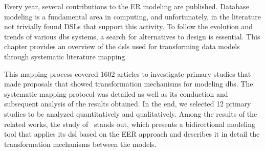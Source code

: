 Every year, several contributions to the ER modeling are published.
Database modeling is a fundamental area in computing, and unfortunately, in the literature not trivially found DSLs that support this activity.
To follow the evolution and trends of various \acp{db} systems, a search for alternatives to design is essential.
This chapter provides an overview of the \acp{dsl} used for transforming data models through systematic literature mapping.

This mapping process covered 1602 articles to investigate primary studies that made proposals that showed transformation mechanisms for modeling \acp{db}.
The systematic mapping protocol was detailed as well as its conduction and subsequent analysis of the results obtained.
In the end, we selected 12 primary studies to be analyzed quantitatively and qualitatively.
Among the results of the related works, the study of~\cite{Dimitrieski:2015} stands out, which presents a bidirectional modeling tool that applies its \ac{dsl} based on the EER approach and describes it in detail the transformation mechanisms between the models.

